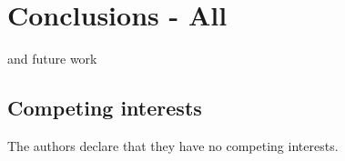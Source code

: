 \documentclass[twocolumn]{bmcart}%
\begin{document}
\section*{Conclusions - All}
and future work 


\begin{backmatter}

\section*{Competing interests}
The authors declare that they have no competing interests.







\end{backmatter}
\end{document}
